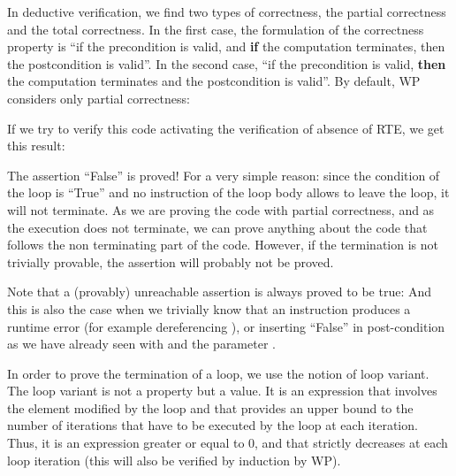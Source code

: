 

In deductive verification, we find two types of correctness, the partial
correctness and the total correctness. In the first case, the
formulation of the correctness property is ``if the precondition is
valid, and \textbf{if} the computation terminates, then the
postcondition is valid''. In the second case, ``if the precondition is
valid, \textbf{then} the computation terminates and the postcondition is
valid''. By default, WP considers only partial correctness:






If we try to verify this code activating the verification of absence of
RTE, we get this result:






The assertion ``False'' is proved! For a very simple reason: since the
condition of the loop is ``True'' and no instruction of the loop body
allows to leave the loop, it will not terminate. As we are proving the
code with partial correctness, and as the execution does not terminate,
we can prove anything about the code that follows the non terminating
part of the code. However, if the termination is not trivially provable,
the assertion will probably not be proved.



\begin{Information}
  Note that a (provably) unreachable assertion is always proved to be true:
  And this is also the case when we trivially know that an instruction
  produces a runtime error (for example dereferencing ), or
  inserting ``False'' in post-condition as we have already seen with
   and the parameter .
\end{Information}


In order to prove the termination of a loop, we use the notion of loop
variant. The loop variant is not a property but a value. It is an
expression that involves the element modified by the loop and that
provides an upper bound to the number of iterations that have to be
executed by the loop at each iteration. Thus, it is an expression
greater or equal to 0, and that strictly decreases at each loop
iteration (this will also be verified by induction by WP).


